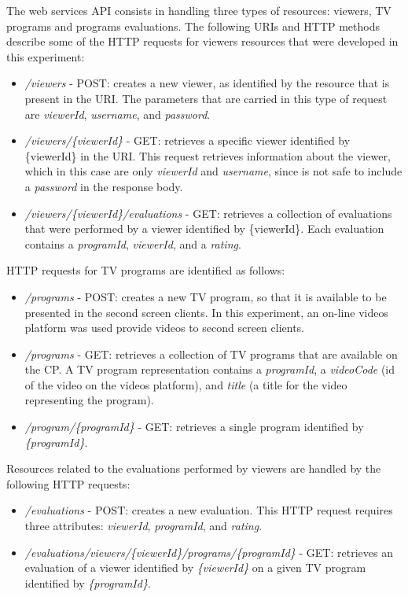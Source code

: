 \documentclass[journal]{IEEEtran}
\begin{document}
The web services API consists in handling three types of resources: viewers, TV programs and programs evaluations. The following URIs and HTTP methods describe some of the HTTP requests for viewers resources that were developed in this experiment:

\begin{itemize}
	\item \emph{/viewers} - POST: creates a new viewer, as identified by the resource that is present in the URI. The parameters that are carried in this type of request are \emph{viewerId}, \emph{username}, and \emph{password}.
	\item \emph{/viewers/\{viewerId\}} - GET: retrieves a specific viewer identified by \{viewerId\} in the URI. This request retrieves information about the viewer, which in this case are only \emph{viewerId} and \emph{username}, since is not safe to include a \emph{password} in the response body.
	\item \emph{/viewers/\{viewerId\}/evaluations} - GET: retrieves a collection of evaluations that were performed by a viewer identified by \{viewerId\}. Each evaluation contains a \emph{programId}, \emph{viewerId}, and a \emph{rating}.
\end{itemize}

HTTP requests for TV programs are identified as follows:

\begin{itemize}
	\item \emph{/programs} - POST: creates a new TV program, so that it is available to be presented in the second screen clients. In this experiment, an on-line videos platform was used provide videos to second screen clients. 
	\item \emph{/programs} - GET: retrieves a collection of TV programs that are available on the CP. A TV program representation contains a \emph{programId}, a \emph{videoCode} (id of the video on the videos platform), and \emph{title} (a title for the video representing the program).
	\item \emph{/program/\{programId\}} - GET: retrieves a single program identified by \emph{\{programId\}}.
\end{itemize}

Resources related to the evaluations performed by viewers are handled by the following HTTP requests:

\begin{itemize}
	\item \emph{/evaluations} - POST: creates a new evaluation. This HTTP request requires three attributes: \emph{viewerId}, \emph{programId}, and \emph{rating}.
	\item \emph{/evaluations/viewers/\{viewerId\}/programs/\{programId\}} - GET: retrieves an evaluation of a viewer identified by \emph{\{viewerId\}} on a given TV program identified by \emph{\{programId\}}.
\end{itemize}
\end{document}
